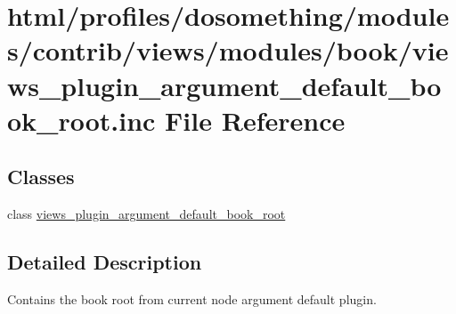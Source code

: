 \hypertarget{views__plugin__argument__default__book__root_8inc}{
\section{html/profiles/dosomething/modules/contrib/views/modules/book/views\_\-plugin\_\-argument\_\-default\_\-book\_\-root.inc File Reference}
\label{views__plugin__argument__default__book__root_8inc}
}
\subsection*{Classes}
\begin{DoxyCompactItemize}
\item 
class \hyperlink{classviews__plugin__argument__default__book__root}{views\_\-plugin\_\-argument\_\-default\_\-book\_\-root}
\end{DoxyCompactItemize}


\subsection{Detailed Description}
Contains the book root from current node argument default plugin. 